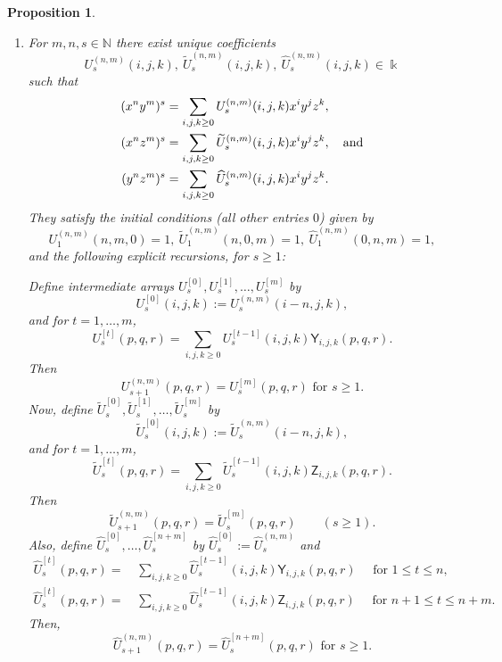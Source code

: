 \documentclass{amsart}
\newtheorem{proposition}[theorem]{Proposition}
\theoremstyle{definition}
\theoremstyle{remark}
\numberwithin{equation}{section}
\begin{document}
\begin{proposition}
\begin{enumerate}
\item [\rm (2)] For $m,n,s\in \mathbb{N}$ there exist unique coefficients
\[
U^{(n,m)}_{s}(i,j,k),\ \widetilde U^{(n,m)}_{s}(i,j,k),\ \widehat U^{(n,m)}_{s}(i,j,k)\in\Bbbk
\]
such that
\begin{align}
(x^n y^m)^s&=\sum_{i,j,k\ge 0}U^{(n,m)}_{s}(i,j,k)x^i y^j z^k,\label{Uxycase4}\\
(x^n z^m)^s&=\sum_{i,j,k\ge 0}\widetilde U^{(n,m)}_{s}(i,j,k)x^i y^j z^k, \quad {\rm and} \label{Uxzcase4}\\
(y^n z^m)^s&=\sum_{i,j,k\ge 0}\widehat U^{(n,m)}_{s}(i,j,k)x^i y^j z^k.\label{Uyzcase4}
\end{align}
They satisfy the initial conditions {\rm (}all other entries $0${\rm )} given by 
\[
U^{(n,m)}_{1}(n,m,0)=1,\ \widetilde U^{(n,m)}_{1}(n,0,m)=1,\ \widehat U^{(n,m)}_{1}(0,n,m)=1,
\]
and the following explicit recursions, for $s\ge 1$:

Define intermediate arrays $U^{[0]}_{s},U^{[1]}_{s},\dots,U^{[m]}_{s}$ by
\[
U^{[0]}_{s}(i,j,k):=U^{(n,m)}_{s}(i-n,j,k),
\]
and for $t=1,\dots,m$,
\begin{equation}\label{Uxystep4}
U^{[t]}_{s}(p,q,r)=\sum_{i,j,k\ge 0}U^{[t-1]}_{s}(i,j,k)\mathsf Y_{i,j,k}(p,q,r).
\end{equation}
Then
\begin{equation}\label{Uxyreccase4}
U^{(n,m)}_{s+1}(p,q,r)=U^{[m]}_{s}(p,q,r) \text{ for } s\ge 1.
\end{equation}
Now, define $\widetilde U^{[0]}_{s},\widetilde U^{[1]}_{s},\dots,\widetilde U^{[m]}_{s}$ by
\[
\widetilde U^{[0]}_{s}(i,j,k):=\widetilde U^{(n,m)}_{s}(i-n,j,k),
\]
and for $t=1,\dots,m$,
\begin{equation}\label{Uxzstep4}
\widetilde U^{[t]}_{s}(p,q,r)=\sum_{i,j,k\ge 0}\widetilde U^{[t-1]}_{s}(i,j,k)\mathsf Z_{i,j,k}(p,q,r).
\end{equation}
Then
\begin{equation}\label{Uxzreccase4}
\widetilde U^{(n,m)}_{s+1}(p,q,r)=\widetilde U^{[m]}_{s}(p,q,r)\qquad(s\ge 1).
\end{equation}
Also, define $\widehat U^{[0]}_{s},\dots,\widehat U^{[n+m]}_{s}$ by $\widehat U^{[0]}_{s}:=\widehat U^{(n,m)}_{s}$ and
\begin{align*}
\widehat U^{[t]}_{s}(p,q,r) = &\, \sum_{i,j,k\ge 0}\widehat U^{[t-1]}_{s}(i,j,k)\mathsf Y_{i,j,k}(p,q,r) \quad \text{ for } 1\le t\le n, \\ 
\widehat U^{[t]}_{s}(p,q,r) = &\, \sum_{i,j,k\ge 0}\widehat U^{[t-1]}_{s}(i,j,k)\mathsf Z_{i,j,k}(p,q,r) \quad \text{ for } n+1\le t\le n+m.
\end{align*}
Then, 
\begin{equation}\label{Uyzreccase4}
\widehat U^{(n,m)}_{s+1}(p,q,r)=\widehat U^{[n+m]}_{s}(p,q,r)\text{ for } s\ge 1.
\end{equation}


\end{enumerate}
\end{proposition}
\end{document}

